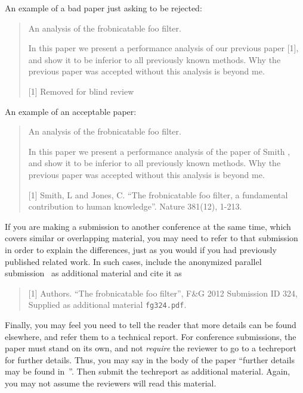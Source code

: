 \documentclass[10pt,twocolumn,letterpaper]{article}
\begin{document}
An example of a bad paper just asking to be rejected:
\begin{quote}
\begin{center}
    An analysis of the frobnicatable foo filter.
\end{center}

   In this paper we present a performance analysis of our
   previous paper [1], and show it to be inferior to all
   previously known methods.  Why the previous paper was
   accepted without this analysis is beyond me.

   [1] Removed for blind review
\end{quote}


An example of an acceptable paper:

\begin{quote}
\begin{center}
     An analysis of the frobnicatable foo filter.
\end{center}

   In this paper we present a performance analysis of the
   paper of Smith \etal [1], and show it to be inferior to
   all previously known methods.  Why the previous paper
   was accepted without this analysis is beyond me.

   [1] Smith, L and Jones, C. ``The frobnicatable foo
   filter, a fundamental contribution to human knowledge''.
   Nature 381(12), 1-213.
\end{quote}

If you are making a submission to another conference at the same time,
which covers similar or overlapping material, you may need to refer to that
submission in order to explain the differences, just as you would if you
had previously published related work.  In such cases, include the
anonymized parallel submission~\cite{Authors12} as additional material and
cite it as
\begin{quote}
[1] Authors. ``The frobnicatable foo filter'', F\&G 2012 Submission ID 324,
Supplied as additional material {\tt fg324.pdf}.
\end{quote}

Finally, you may feel you need to tell the reader that more details can be
found elsewhere, and refer them to a technical report.  For conference
submissions, the paper must stand on its own, and not {\em require} the
reviewer to go to a techreport for further details.  Thus, you may say in
the body of the paper ``further details may be found
in~\cite{Authors12b}''.  Then submit the techreport as additional material.
Again, you may not assume the reviewers will read this material.
\end{document}
